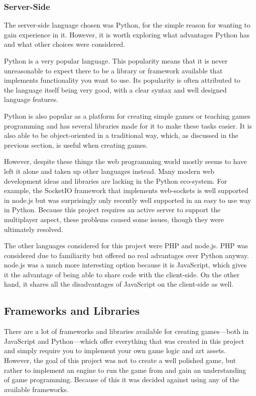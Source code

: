 \subsubsection{Server-Side}
The server-side language chosen was Python, for the simple reason for wanting to gain experience in it. However, it is worth exploring what advantages Python has and what other choices were considered.

Python is a very popular language. This popularity means that it is never unreasonable to expect there to be a library or framework available that implements functionality you want to use. Its popularity is often attributed to the language itself being very good, with a clear syntax and well designed language features.

Python is also popular as a platform for creating simple games or teaching games programming and has several libraries made for it to make these tasks easier. It is also able to be object-oriented in a traditional way, which, as discussed in the previous section, is useful when creating games.

However, despite these things the web programming world mostly seems to have left it alone and taken up other languages instead. Many modern web development ideas and libraries are lacking in the Python eco-system. For example, the SocketIO framework that implements web-sockets is well supported in node.js but was surprisingly only recently well supported in an easy to use way in Python. Because this project requires an active server to support the multiplayer aspect, these problems caused some issues, though they were ultimately resolved.

The other languages considered for this project were PHP and node.js. PHP was considered due to familiarity but offered no real advantages over Python anyway. node.js was a much more interesting option because it is JavaScript, which gives it the advantage of being able to share code with the client-side. On the other hand, it shares all the disadvantages of JavaScript on the client-side as well.

\subsection{Frameworks and Libraries}
There are a lot of frameworks and libraries available for creating games---both in JavaScript and Python---which offer everything that was created in this project and simply require you to implement your own game logic and art assets. However, the goal of this project was not to create a well polished game, but rather to implement an engine to run the game from and gain an understanding of game programming. Because of this it was decided against using any of the available frameworks.

